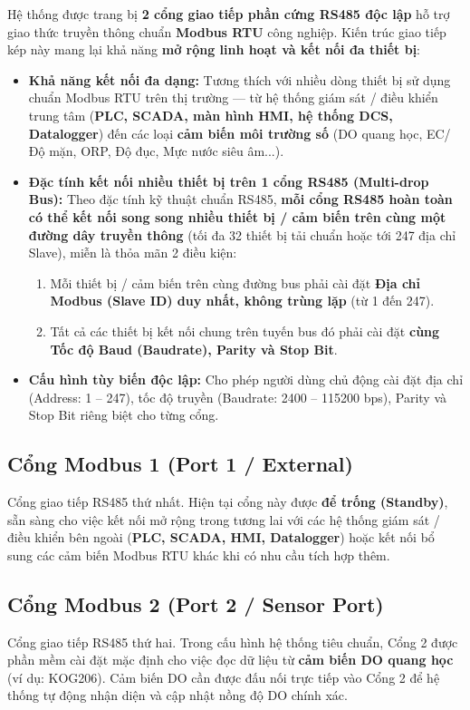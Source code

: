 \documentclass[12pt,a4paper]{article}
\begin{document}
Hệ thống được trang bị \textbf{2 cổng giao tiếp phần cứng RS485 độc lập} hỗ trợ giao thức truyền thông chuẩn \textbf{Modbus RTU} công nghiệp. Kiến trúc giao tiếp kép này mang lại khả năng \textbf{mở rộng linh hoạt và kết nối đa thiết bị}:
\begin{itemize}[label={-}]
    \item \textbf{Khả năng kết nối đa dạng:} Tương thích với nhiều dòng thiết bị sử dụng chuẩn Modbus RTU trên thị trường --- từ hệ thống giám sát / điều khiển trung tâm (\textbf{PLC, SCADA, màn hình HMI, hệ thống DCS, Datalogger}) đến các loại \textbf{cảm biến môi trường số} (DO quang học, EC/Độ mặn, ORP, Độ đục, Mực nước siêu âm...).
    \item \textbf{Đặc tính kết nối nhiều thiết bị trên 1 cổng RS485 (Multi-drop Bus):} Theo đặc tính kỹ thuật chuẩn RS485, \textbf{mỗi cổng RS485 hoàn toàn có thể kết nối song song nhiều thiết bị / cảm biến trên cùng một đường dây truyền thông} (tối đa 32 thiết bị tải chuẩn hoặc tới 247 địa chỉ Slave), miễn là thỏa mãn 2 điều kiện:
    \begin{enumerate}
        \item Mỗi thiết bị / cảm biến trên cùng đường bus phải cài đặt \textbf{Địa chỉ Modbus (Slave ID) duy nhất, không trùng lặp} (từ 1 đến 247).
        \item Tất cả các thiết bị kết nối chung trên tuyến bus đó phải cài đặt \textbf{cùng Tốc độ Baud (Baudrate), Parity và Stop Bit}.
    \end{enumerate}
    \item \textbf{Cấu hình tùy biến độc lập:} Cho phép người dùng chủ động cài đặt địa chỉ (Address: 1 -- 247), tốc độ truyền (Baudrate: 2400 -- 115200 bps), Parity và Stop Bit riêng biệt cho từng cổng.
\end{itemize}

\subsection{Cổng Modbus 1 (Port 1 / External)}
Cổng giao tiếp RS485 thứ nhất. Hiện tại cổng này được \textbf{để trống (Standby)}, sẵn sàng cho việc kết nối mở rộng trong tương lai với các hệ thống giám sát / điều khiển bên ngoài (\textbf{PLC, SCADA, HMI, Datalogger}) hoặc kết nối bổ sung các cảm biến Modbus RTU khác khi có nhu cầu tích hợp thêm.

\subsection{Cổng Modbus 2 (Port 2 / Sensor Port)}
Cổng giao tiếp RS485 thứ hai. Trong cấu hình hệ thống tiêu chuẩn, Cổng 2 được phần mềm cài đặt mặc định cho việc đọc dữ liệu từ \textbf{cảm biến DO quang học} (ví dụ: KOG206). Cảm biến DO cần được đấu nối trực tiếp vào Cổng 2 để hệ thống tự động nhận diện và cập nhật nồng độ DO chính xác.
\end{document}
